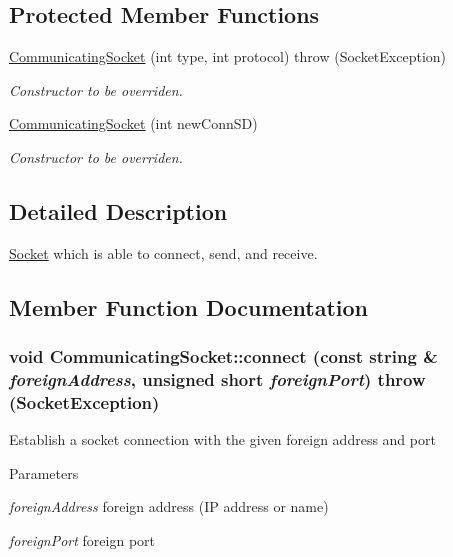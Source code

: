 \subsection*{Protected Member Functions}
\begin{DoxyCompactItemize}
\item 
\hypertarget{classCommunicatingSocket_a0017517b8d6e761fde0c40475af3b2ab}{
\hyperlink{classCommunicatingSocket_a0017517b8d6e761fde0c40475af3b2ab}{CommunicatingSocket} (int type, int protocol)  throw (SocketException)}
\label{classCommunicatingSocket_a0017517b8d6e761fde0c40475af3b2ab}

\begin{DoxyCompactList}\small\item\em Constructor to be overriden. \item\end{DoxyCompactList}\item 
\hypertarget{classCommunicatingSocket_a27d758db782b3be7d28741e92cb613d1}{
\hyperlink{classCommunicatingSocket_a27d758db782b3be7d28741e92cb613d1}{CommunicatingSocket} (int newConnSD)}
\label{classCommunicatingSocket_a27d758db782b3be7d28741e92cb613d1}

\begin{DoxyCompactList}\small\item\em Constructor to be overriden. \item\end{DoxyCompactList}\end{DoxyCompactItemize}


\subsection{Detailed Description}
\hyperlink{classSocket}{Socket} which is able to connect, send, and receive. 

\subsection{Member Function Documentation}
\hypertarget{classCommunicatingSocket_a9192374d9baab8e189860aa8d913683c}{
\subsubsection[{connect}]{\setlength{\rightskip}{0pt plus 5cm}void CommunicatingSocket::connect (const string \& {\em foreignAddress}, \/  unsigned short {\em foreignPort})  throw ({\bf SocketException})}}
\label{classCommunicatingSocket_a9192374d9baab8e189860aa8d913683c}
Establish a socket connection with the given foreign address and port 
\begin{DoxyParams}{Parameters}
\item[{\em foreignAddress}]foreign address (IP address or name) \item[{\em foreignPort}]foreign port \end{DoxyParams}

